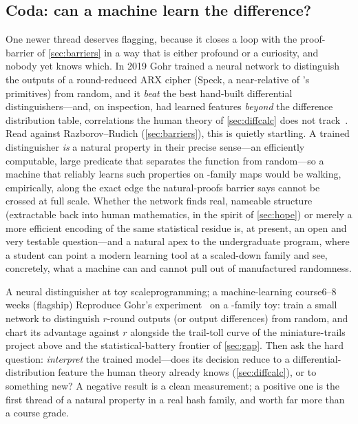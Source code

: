 \subsection{Coda: can a machine learn the difference?}\label{sec:mlcrypt}

One newer thread deserves flagging, because it closes a loop with the
proof-barrier of \cref{sec:barriers} in a way that is either profound or
a curiosity, and nobody yet knows which. In 2019 Gohr trained a neural
network to distinguish the outputs of a round-reduced ARX cipher
(Speck, a near-relative of \SHA{}'s primitives) from random, and it
\emph{beat} the best hand-built differential distinguishers---and, on
inspection, had learned features \emph{beyond} the difference
distribution table, correlations the human theory of \cref{sec:diffcalc}
does not track~\citep{Gohr2019}. Read against Razborov--Rudich
(\cref{sec:barriers}), this is quietly startling. A trained
distinguisher \emph{is} a natural property in their precise sense---an
efficiently computable, large predicate that separates the function
from random---so a machine that reliably learns such properties on
\SHA{}-family maps would be walking, empirically, along the exact edge
the natural-proofs barrier says cannot be crossed at full scale.
Whether the network finds real, nameable structure (extractable back
into human mathematics, in the spirit of \cref{sec:hope}) or merely a
more efficient encoding of the same statistical residue is, at present,
an open and very testable question---and a natural apex to the
undergraduate program, where a student can point a modern learning tool
at a scaled-down family and see, concretely, what a machine can and
cannot pull out of manufactured randomness.

\begin{project}{A neural distinguisher at toy scale}{programming;
  a machine-learning course}{6--8 weeks (flagship)}
  Reproduce Gohr's experiment~\citep{Gohr2019} on a \SHA{}-family toy:
  train a small network to distinguish $r$-round outputs (or output
  differences) from random, and chart its advantage against $r$
  alongside the trail-toll curve of the miniature-trails project above
  and the statistical-battery frontier of \cref{sec:gap}. Then
  ask the hard question: \emph{interpret} the trained model---does its
  decision reduce to a differential-distribution feature the human
  theory already knows (\cref{sec:diffcalc}), or to something new? A
  negative result is a clean measurement; a positive one is the first
  thread of a natural property in a real hash family, and worth far
  more than a course grade.
\end{project}
